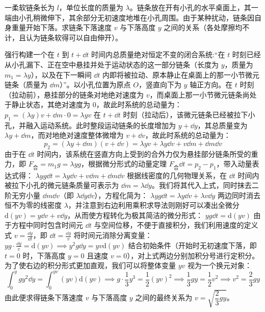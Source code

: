 \begin{example}
一柔软链条长为 $l$，单位长度的质量为 $\lambda$。链条放在开有小孔的水平桌面上，其一端由小孔稍微伸下，其余部分无初速度地堆在小孔周围。由于某种扰动，链条因自身重量开始下落。求链条下落速度 $v$ 与下落高度 $y$ 之间的关系（各处摩擦均不计，且认为链条软得可以自由伸开）。
\end{example}
\begin{solution}
强行构建一个在 $t$ 到 $t+\dd t$ 时间内总质量绝对恒定不变的闭合系统:“在 $t$ 时刻已经从小孔漏下、正在空中悬挂并处于运动状态的这一部分链条（长度为 $y$，质量为 $m_1 = \lambda y$），以及在下一瞬间 $\dd t$ 内即将被拉动、原本静止在桌面上的那一小节微元链条（质量为 $\dd m$）”。以小孔位置为原点 $O$，竖直向下为 $y$ 轴正方向。在 $t$ 时刻（拉动前），悬挂部分的链条对地绝对速度为 $v$，而桌面上那一小节微元链条尚处于静止状态，其绝对速度为 $0$，故此时系统的总动量为：
 \(p_1 = (\lambda y)v + \dd m \cdot 0 = \lambda yv\) 
在 $t+\dd t$ 时刻（拉动后），该微元链条已经被拉下小孔，并融入运动系统。此时整段运动链条的长度增加为 $y+\dd y$，其总质量变为 $\lambda y + \dd m$，而对地绝对速度整体微增为 $v+\dd v$，故此时系统的总动量为：
\[
p_2 = (\lambda y + \dd m)(v + \dd v) = \lambda yv + \lambda y\dd v + v\dd m + \dd m\dd v
\]
由于在 $\dd t$ 时间内，该系统在竖直方向上受到的合外力仅为悬挂部分链条所受的重力，即 $F_{\text{合}} = m_1 g = \lambda yg$，根据微分形式的动量定理 $F_{\text{合}}\dd t = p_2 - p_1$，带入动量表达式得：
 \(\lambda yg\dd t = \lambda y\dd v + v\dd m + \dd m\dd v\) 
根据线密度的几何物理关系，在 $\dd t$ 时间内被拉下小孔的微元链条质量可表示为 $\dd m = \lambda \dd y$。我们将其代入上式，同时抹去二阶无穷小量 $\dd m\dd v$（即 $\lambda \dd y\dd v$），方程化简为：
 \(\lambda yg\dd t = \lambda y\dd v + \lambda v\dd y\) 
两边同时消去恒不为零的线密度 $\lambda$，并注意到右边利用乘积求导法则刚好可以凑出全微分 $\mathrm{d}(yv) = y\dd v + v\dd y$，从而使方程转化为极其简洁的微分形式：
 \(yg\dd t = \mathrm{d}(yv)\) 
由于方程中同时包含时间元 $\dd t$ 与空间位移，不便于直接积分，我们利用速度的定义式 $v = \frac{\dd y}{\dd t}$，即 $\dd t = \frac{\dd y}{v}$ 将时间元消除分离变量：
 \(yg \cdot \frac{\dd y}{v} = \mathrm{d}(yv) \implies y^2g\dd y = yv\mathrm{d}(yv)\) 
结合初始条件（开始时无初速度下落，即 $t=0$ 时，下落高度 $y=0$ 且速度 $v=0$），对上式两边分别加积分号进行定积分。为了使右边的积分形式更加直观，我们可以将整体变量 $yv$ 视为一个换元对象：
\[
\int_{0}^{y} gy^2\dd y = \int_{0}^{yv} (yv)\mathrm{d}(yv) \implies g \cdot \frac{1}{3}y^3 = \frac{1}{2}(yv)^2
\implies
\frac{1}{3}gy = \frac{1}{2}v^2 \implies v^2 = \frac{2}{3}gy
\]
由此便求得链条下落速度 $v$ 与下落高度 $y$ 之间的最终关系为 $v = \sqrt{\dfrac{2}{3}gy}$。
\end{solution}

